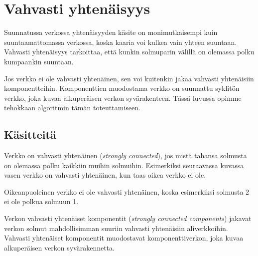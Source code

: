 \chapter{Vahvasti yhtenäisyys}


Suunnatussa verkossa yhtenäisyyden
käsite on monimutkaisempi
kuin suuntaamattomassa verkossa,
koska kaaria voi kulkea vain yhteen suuntaan.
Vahvasti yhtenäisyys tarkoittaa,
että kunkin solmuparin välillä on
olemassa polku kumpaankin suuntaan.

Jos verkko ei ole vahvasti yhtenäinen,
sen voi kuitenkin jakaa vahvasti yhtenäisiin
komponentteihin. Komponenttien muodostama
verkko on suunnattu syklitön verkko,
joka kuvaa alkuperäisen verkon syvärakenteen.
Tässä luvussa opimme tehokkaan algoritmin tämän
toteuttamiseen.

\section{Käsitteitä}

Verkko on vahvasti yhtenäinen
(\textit{strongly connected}),
jos mistä tahansa solmusta on olemassa polku
kaikkiin muihin solmuihin.
Esimerkiksi seuraavassa kuvassa vasen
verkko on vahvasti yhtenäinen,
kun taas oikea verkko ei ole.

\begin{center}
\end{center}

Oikeanpuoleinen verkko ei ole vahvasti yhtenäinen,
koska esimerkiksi solmusta 2 ei ole
polkua solmuun 1.

Verkon vahvasti yhtenäiset komponentit
(\textit{strongly connected components})
jakavat verkon solmut mahdollisimman
suuriin vahvasti yhtenäisiin aliverkkoihin.
Vahvasti yhtenäiset komponentit
muodostavat komponenttiverkon,
joka kuvaa alkuperäisen verkon syvärakennetta.

